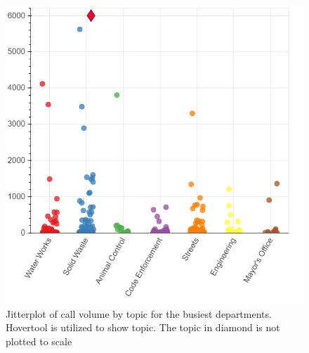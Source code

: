 \documentclass{article}
\begin{document}
\begin{figure}[p]
  \includegraphics[scale=0.25]{jitterplot.png}
  \caption{Jitterplot of call volume by topic for the busiest departments.  Hovertool is utilized to show topic.  The topic in diamond is not plotted to scale}
\end{figure}
\end{document}
